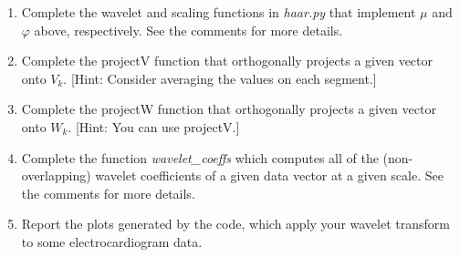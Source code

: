 \documentclass[12pt,twoside]{article}
\begin{document}
\begin{enumerate}
\begin{enumerate}
  \item Complete the wavelet and scaling functions in \emph{haar.py} that implement $\mu$
    and $\varphi$ above, respectively.  See the comments for more
    details.
  \item Complete the projectV function that orthogonally projects a
    given vector onto $V_k$. [Hint: Consider averaging the values on each segment.]
  \item Complete the projectW function that orthogonally projects a
    given vector onto $W_k$. [Hint: You can use projectV.]
  \item Complete the function \emph{wavelet\_coeffs}
    which computes all of the (non-overlapping) wavelet 
    coefficients of a given data vector at a given scale.  
    See the comments for more details.
    \item Report the plots generated by the code, which apply your wavelet transform to some electrocardiogram data.
    

\end{enumerate}
\end{enumerate}
\end{document}
